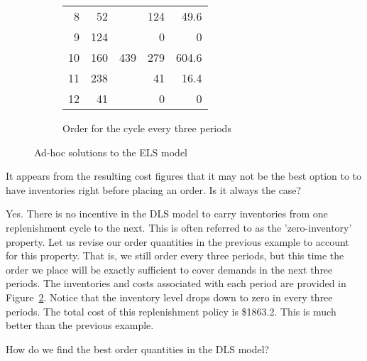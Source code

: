 \begin{solution}
\begin{figure}[htbp]
\begin{subfigure}[b]{0.5\textwidth}
\begin{tabular}{rrrrr}
    8     & 52    &       & 124   & 49.6 \\
    9     & 124   &       & 0     & 0 \\
    10    & 160   & 439   & 279   & 604.6 \\
    11    & 238   &       & 41    & 16.4 \\
    12    & 41    &       & 0     & 0 \\
    \bottomrule
    \end{tabular}%
\caption{Order for the cycle every three periods}
\label{fig:3just}
\end{subfigure}
\caption{Ad-hoc solutions to the ELS model}
\end{figure}
\end{solution}


\begin{question}
It appears from the resulting cost figures that it may not be the best option to to have inventories right before placing an order. Is it always the case? 
\end{question}

\begin{solution}
Yes. There is no incentive in the DLS model to carry inventories from one replenishment cycle to the next. This is often referred to as the 'zero-inventory' property. Let us revise our order quantities in the previous example to account for this property. That is, we still order every three periods, but this time the order we place will be exactly sufficient to cover demands in the next three periods. The inventories and costs associated with each period are provided in Figure~\ref{fig:3just}. Notice that the inventory level drops down to zero in every three periods. The total cost of this replenishment policy is \$1863.2. This is much better than the previous example.
\end{solution}

\begin{question}
How do we find the best order quantities in the DLS model?
\end{question}

